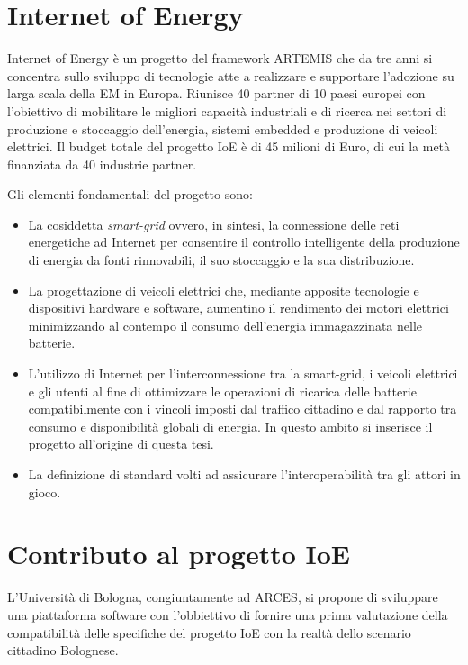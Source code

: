 \section{Internet of Energy}

Internet of Energy è un progetto del framework ARTEMIS che da tre anni si concentra sullo sviluppo di tecnologie atte a realizzare e supportare l'adozione su larga scala della EM in Europa. Riunisce 40 partner di 10 paesi europei con l'obiettivo di mobilitare le migliori capacità industriali e di ricerca nei settori di produzione e stoccaggio dell'energia, sistemi embedded e produzione di veicoli elettrici. Il budget totale del progetto IoE è di 45 milioni di Euro, di cui la metà finanziata da 40 industrie partner.

Gli elementi fondamentali del progetto sono:

\begin{itemize}
	\item La cosiddetta \emph{smart-grid} ovvero, in sintesi, la connessione delle reti energetiche ad Internet per consentire il controllo intelligente della produzione di energia da fonti rinnovabili, il suo stoccaggio e la sua distribuzione.
	\item La progettazione di veicoli elettrici che, mediante apposite tecnologie e dispositivi hardware e software, aumentino il rendimento dei motori elettrici minimizzando al contempo il consumo dell'energia immagazzinata nelle batterie.
	\item L'utilizzo di Internet per l'interconnessione tra la smart-grid, i veicoli elettrici e gli utenti al fine di ottimizzare le operazioni di ricarica delle batterie compatibilmente con i vincoli imposti dal traffico cittadino e dal rapporto tra consumo e disponibilità globali di energia. In questo ambito si inserisce il progetto all'origine di questa tesi.
	\item La definizione di standard volti ad assicurare l'interoperabilità tra gli attori in gioco.
\end{itemize}

\section{Contributo al progetto IoE}

L'Università di Bologna, congiuntamente ad ARCES, si propone di sviluppare una piattaforma software con l'obbiettivo di fornire una prima valutazione della compatibilità delle specifiche del progetto IoE con la realtà dello scenario cittadino Bolognese.

